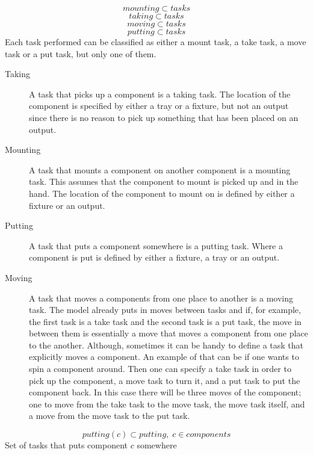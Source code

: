 \documentclass[10pt,a4paper]{report}
\begin{document}
\begin{equation}\label{eq:26}
mounting \subset tasks
\end{equation}
\begin{equation}\label{eq:27}
taking \subset tasks
\end{equation}
\begin{equation}\label{eq:28}
moving \subset tasks
\end{equation}
\begin{equation}\label{eq:29}
putting \subset tasks
\end{equation}
Each task performed can be classified as either a mount task, a take task, a move task or a put task, but only one of them.
\begin{description}
\item[Taking] A task that picks up a component is a taking task. The location of the component is specified by either a tray or a fixture, but not an output since there is no reason to pick up something that has been placed on an output.

\item[Mounting] A task that mounts a component on another component is a mounting task. This assumes that the component to mount is picked up and in the hand. The location of the component to mount on is defined by either a fixture or an output.

\item[Putting] A task that puts a component somewhere is a putting task. Where a component is put is defined by either a fixture, a tray or an output.

\item[Moving] A task that moves a components from one place to another is a moving task. The model already puts in moves between tasks and if, for example, the first task is a take task and the second task is a put task, the move in between them is essentially a move that moves a component from one place to the another. Although, sometimes it can be handy to define a task that explicitly moves a component. An example of that can be if one wants to spin a component around. Then one can specify a take task in order to pick up the component, a move task to turn it, and a put task to put the component back. In this case there will be three moves of the component; one to move from the take task to the move task, the move task itself, and a move from the move task to the put task.
\end{description}
\begin{equation}\label{eq:35}
putting(c) \subset putting, \; c \in components\end{equation}
Set of tasks that puts component $c$ somewhere
\end{document}
